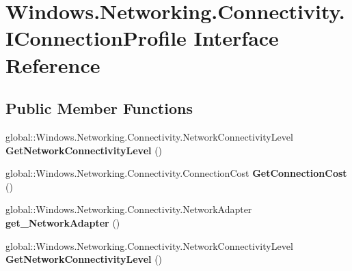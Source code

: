 \hypertarget{interface_windows_1_1_networking_1_1_connectivity_1_1_i_connection_profile}{}\section{Windows.\+Networking.\+Connectivity.\+I\+Connection\+Profile Interface Reference}
\label{interface_windows_1_1_networking_1_1_connectivity_1_1_i_connection_profile}
\subsection*{Public Member Functions}
\begin{DoxyCompactItemize}
\item 
\mbox{\label{interface_windows_1_1_networking_1_1_connectivity_1_1_i_connection_profile_a8419d8432ed57c0bd7560b426edf602f}} 
global\+::\+Windows.\+Networking.\+Connectivity.\+Network\+Connectivity\+Level {\bfseries Get\+Network\+Connectivity\+Level} ()
\item 
\mbox{\label{interface_windows_1_1_networking_1_1_connectivity_1_1_i_connection_profile_a17f76f7b6e209095ea713f00343d03cb}} 
global\+::\+Windows.\+Networking.\+Connectivity.\+Connection\+Cost {\bfseries Get\+Connection\+Cost} ()
\item 
\mbox{\label{interface_windows_1_1_networking_1_1_connectivity_1_1_i_connection_profile_a7ff1cc52f1dd6c6f6110d0e5fe5f29df}} 
global\+::\+Windows.\+Networking.\+Connectivity.\+Network\+Adapter {\bfseries get\+\_\+\+Network\+Adapter} ()
\item 
\mbox{\label{interface_windows_1_1_networking_1_1_connectivity_1_1_i_connection_profile_a8419d8432ed57c0bd7560b426edf602f}} 
global\+::\+Windows.\+Networking.\+Connectivity.\+Network\+Connectivity\+Level {\bfseries Get\+Network\+Connectivity\+Level} ()
\item 
\mbox{\label{interface_windows_1_1_networking_1_1_connectivity_1_1_i_connection_profile_a17f76f7b6e209095ea713f00343d03cb}} 

\end{DoxyCompactItemize}
